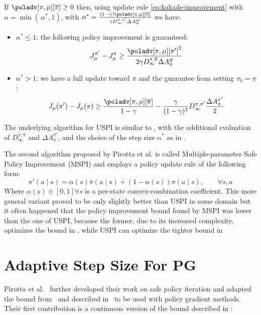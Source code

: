 \begin{theorem}
\label{th:pirotta-algo}
If $\poladv[\pi, \mu][\overline{\pi}] \geq 0$ then, using update rule \ref{eq:kakade-improvement} with $\alpha = \min(\, \alpha^*, 1)$, with $\alpha^* = \frac{(1-\gamma)\poladv[\pi, \mu][\overline{\pi}]}{\gamma D_\infty^{\pi, \pi'}\Delta A_\pi^{\pi'}}$ we have:
\begin{itemize}
\item $\alpha^* \leq 1$: the following policy improvement is guaranteed:
\[
J_\mu^{\pi'} - J_\mu^\pi \geq \frac{{\poladv[\pi, \mu][\pi']}^2}{2\gamma D_\infty^{\pi, \overline{\pi}}\Delta A_\pi^{\overline{\pi}}}
\]
\item $\alpha^* > 1$: we have a full update toward $\overline{\pi}$ and the guarantee from  setting $\pi_b = \pi$:
\begin{equation}
J_{\mu}(\pi') - J_\mu(\pi) \geq \frac{\poladv[\pi, \mu][\overline{\pi}]}{1-\gamma} - \frac{\gamma}{(1-\gamma)^2}{D_\infty^{\pi, \pi'}} \frac{\Delta A_{\pi}^{\pi'}}{2}
\end{equation}
\end{itemize}
\end{theorem}

The underlying algorithm for USPI is similar to , with the additional evaluation of $D_\infty^{\pi, \overline{\pi}}$ and $\Delta A_\pi^{\pi'}$, and the choice of the step size $\alpha^*$ as in .

The second algorithm proposed by Pirotta et al. is called Multiple-parameter Safe Policy Improvement (MSPI) and employs a policy update rule of the following form:
\[
\pi'(a\mid s) = \alpha(s)\overline{\pi}(a\mid s) + (1-\alpha(s))\pi(a\mid s),\qquad\forall s,a
\]
Where $\alpha(s)\in [0,1] \forall s$ is a per-state convex-combination coefficient. This more general variant proved to be only slightly better than USPI in some domain but it often happened that the policy improvement bound found by MSPI was lower than the one of USPI, because the former, due to its increased complexity, optimizes the bound in , while USPI can optimize the tighter bound in 

\section{Adaptive Step Size For PG}
\label{sec:ass}
Pirotta et al.~\cite{adaptive_step} further developed their work on safe policy iteration and adapted the bound from~\cite{safe_iteration} and described in~ to be used with policy gradient methods.\\
Their first contribution is a continuous version of the bound described in :

